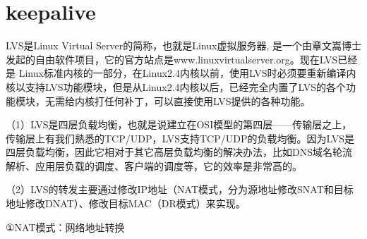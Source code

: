 \chapter{keepalive}

LVS是Linux Virtual Server的简称，也就是Linux虚拟服务器, 是一个由章文嵩博士发起的自由软件项目，它的官方站点是www.linuxvirtualserver.org。现在LVS已经是 Linux标准内核的一部分，在Linux2.4内核以前，使用LVS时必须要重新编译内核以支持LVS功能模块，但是从Linux2.4内核以后，已经完全内置了LVS的各个功能模块，无需给内核打任何补丁，可以直接使用LVS提供的各种功能。

（1）LVS是四层负载均衡，也就是说建立在OSI模型的第四层——传输层之上，传输层上有我们熟悉的TCP/UDP，LVS支持TCP/UDP的负载均衡。因为LVS是四层负载均衡，因此它相对于其它高层负载均衡的解决办法，比如DNS域名轮流解析、应用层负载的调度、客户端的调度等，它的效率是非常高的。
   
（2）LVS的转发主要通过修改IP地址（NAT模式，分为源地址修改SNAT和目标地址修改DNAT）、修改目标MAC（DR模式）来实现。
   
①NAT模式：网络地址转换

